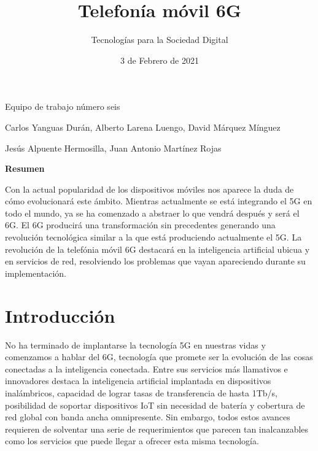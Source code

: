  

 

\graphicspath{{../Book/figures/}}


\title{Telefonía móvil 6G}
\date{3 de Febrero de 2021}            
\author{Tecnologías para la Sociedad Digital}




\maketitle
\begin{description}                             
  {        
  \item[Título en inglés:] \mybooktitleenglish   
  }                                            
  {                                           
  }                                              
\item[Equipo:] Equipo de trabajo número seis     
\item[Autores:] Carlos Yanguas Durán, Alberto Larena Luengo, David Márquez Mínguez                
\item[\expandafter\makefirstuc\expandafter{\mybookTutorOrTutores}:] Jesús Alpuente Hermosilla, Juan Antonio Martínez Rojas          
\end{description}   

\begin{center}
 {\bfseries \Large Resumen}
\end{center}
Con la actual popularidad de los dispositivos móviles nos aparece la duda de cómo evolucionará este ámbito. Mientras actualmente se está integrando el 5G en todo el mundo, ya se ha comenzado a abstraer lo que vendrá después y será el 6G. El 6G producirá una transformación sin precedentes generando una revolución tecnológica similar a la que está produciendo actualmente el 5G. La revolución de la telefónia móvil 6G destacará en la inteligencia artificial ubicua y en servicios de red, resolviendo los problemas que vayan apareciendo durante su implementación.                            

\section{Introducción}
\label{sec:introduccion}

No ha terminado de implantarse la tecnología 5G en nuestras  vidas y comenzamos a hablar del 6G, tecnología que promete ser la evolución de las cosas conectadas a la inteligencia conectada. Entre sus servicios más llamativos e innovadores destaca la inteligencia artificial implantada en dispositivos inalámbricos, capacidad de lograr tasas de transferencia de hasta 1Tb/s, posibilidad de soportar dispositivos IoT sin necesidad de batería y cobertura de red global con banda ancha omnipresente. Sin embargo, todos estos avances requieren de solventar una serie de requerimientos que parecen tan inalcanzables como los servicios que puede llegar a ofrecer esta misma tecnología. 

